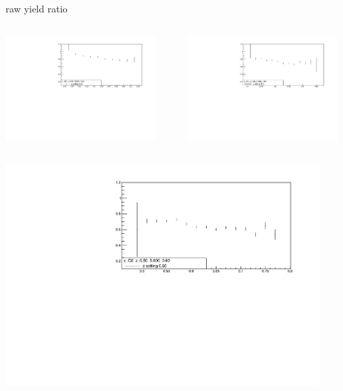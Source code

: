 \begin{frame}{raw yield ratio}
\begin{columns}
\begin{column}[T]{0.5\textwidth}
\includegraphics[width = 0.9\textwidth]{results/yield/statistics/x_Q2_z_0.50_5.000_0.40_ratio.pdf}
\end{column}
\begin{column}[T]{0.5\textwidth}
\includegraphics[width = 0.9\textwidth]{results/yield/statistics/x_Q2_z_0.50_5.000_0.50_ratio.pdf}
\end{column}
\end{columns}
\begin{columns}
\begin{column}[T]{0.5\textwidth}
\includegraphics[width = 0.9\textwidth]{results/yield/statistics/x_Q2_z_0.50_5.000_0.60_ratio.pdf}

\end{column}
\end{columns}
\end{frame}
